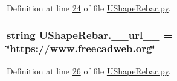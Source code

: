 Definition at line \hyperlink{UShapeRebar_8py_source_l00024}{24} of file \hyperlink{UShapeRebar_8py_source}{U\+Shape\+Rebar.\+py}.

\subsubsection[{\texorpdfstring{\+\_\+\+\_\+url\+\_\+\+\_\+}{__url__}}]{\setlength{\rightskip}{0pt plus 5cm}string U\+Shape\+Rebar.\+\_\+\+\_\+url\+\_\+\+\_\+ = \char`\"{}https\+://www.\+freecadweb.\+org\char`\"{}\hspace{0.3cm}{\ttfamily [private]}}\hypertarget{namespaceUShapeRebar_a7684dab24892bce1b6ca80c35d20f159}{}\label{namespaceUShapeRebar_a7684dab24892bce1b6ca80c35d20f159}


Definition at line \hyperlink{UShapeRebar_8py_source_l00026}{26} of file \hyperlink{UShapeRebar_8py_source}{U\+Shape\+Rebar.\+py}.

